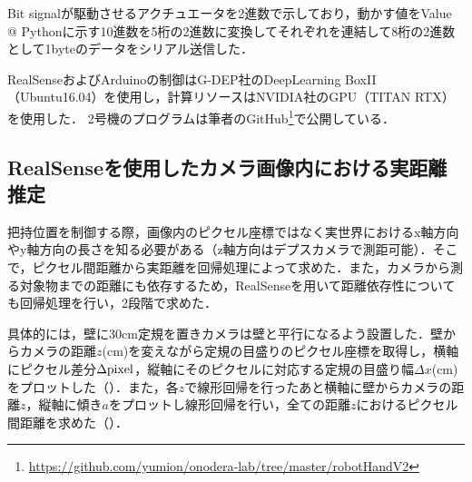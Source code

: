 Bit signalが駆動させるアクチュエータを2進数で示しており，動かす値をValue @ Pythonに示す10進数を5桁の2進数に変換してそれぞれを連結して8桁の2進数として1byteのデータをシリアル送信した．

RealSenseおよびArduinoの制御はG-DEP社のDeepLearning BoxII（Ubuntu16.04）を使用し，計算リソースはNVIDIA社のGPU（TITAN RTX）を使用した．
2号機のプログラムは筆者のGitHub\footnote{\url{https://github.com/yumion/onodera-lab/tree/master/robotHandV2}}で公開している．


\subsection{RealSenseを使用したカメラ画像内における実距離推定}
把持位置を制御する際，画像内のピクセル座標ではなく実世界におけるx軸方向やy軸方向の長さを知る必要がある（z軸方向はデプスカメラで測距可能）．そこで，ピクセル間距離から実距離を回帰処理によって求めた．また，カメラから測る対象物までの距離にも依存するため，RealSenseを用いて距離依存性についても回帰処理を行い，2段階で求めた．

具体的には，壁に30cm定規を置きカメラは壁と平行になるよう設置した．壁からカメラの距離$z$(cm)を変えながら定規の目盛りのピクセル座標を取得し，横軸にピクセル差分$\Delta \rm{pixel}$，縦軸にそのピクセルに対応する定規の目盛り幅$\Delta x$(cm)をプロットした（）．また，各$z$で線形回帰を行ったあと横軸に壁からカメラの距離$z$，縦軸に傾き$a$をプロットし線形回帰を行い，全ての距離$z$におけるピクセル間距離を求めた（）．

